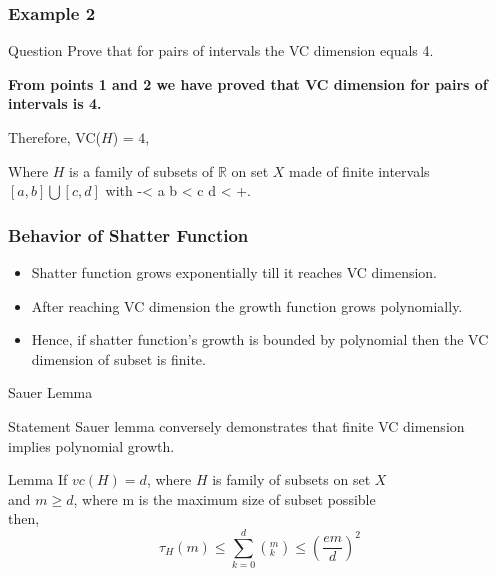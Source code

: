 \documentclass{beamer}
\begin{document}
\begin{frame}
\frametitle{Example 2}
\begin{block}{Question}
Prove that for pairs of intervals the VC dimension equals 4.
\end{block}
\textbf{From points 1 and 2 we have proved that VC dimension for pairs of intervals is 4.}\\
\begin{center}
    Therefore, VC($H$) = $4$,\\
\end{center}
Where $H$ is a family of subsets of $\mathbb{R}$ on set $X$ made of finite intervals $[a,b] \bigcup [c, d]$ with -\infty < a \leq b < c \leq d < +\infty.\\
\end{frame}

\begin{frame}
\frametitle{Behavior of Shatter Function}
\begin{itemize}
    \item Shatter function grows exponentially till it reaches VC dimension.
    \item After reaching VC dimension the growth function grows polynomially.
    \item Hence, if shatter function's growth is bounded by polynomial then the VC dimension of subset is finite.
\end{itemize}
\end{frame}

\begin{frame}{Sauer Lemma}
\begin{alertblock}{Statement}
Sauer lemma conversely demonstrates that finite VC dimension implies polynomial growth.
\end{alertblock}
\begin{alertblock}{Lemma}
If $vc(H) = d$, where $H$ is family of subsets on set $X$\\ 
and $m \geq d$, where m is the maximum size of subset possible\\
then,
\[\tau_{H}(m) \leq \sum_{k=0}^{d} (_{k}^{m}) \leq \left( \frac{em}{d} \right)^{2}\]
\end{alertblock}
\end{frame}
\end{document}
